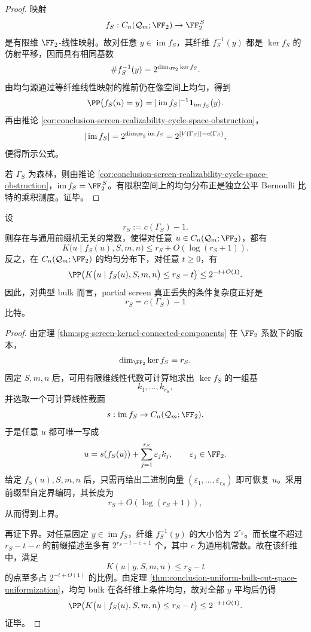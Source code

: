 \begin{proof}
映射
\[
f_S:C_n(\mathcal Q_m;\FF_2)\to \FF_2^{\,S}
\]
是有限维 \(\FF_2\)-线性映射。故对任意 \(y\in\operatorname{im}f_S\)，其纤维 \(f_S^{-1}(y)\) 都是 \(\ker f_S\) 的仿射平移，因而具有相同基数
\[
\#f_S^{-1}(y)=2^{\dim_{\FF_2}\ker f_S}.
\]
由均匀源通过等纤维线性映射的推前仍在像空间上均匀，得到
\[
\PP\bigl(f_S(u)=y\bigr)=|\operatorname{im}f_S|^{-1}\mathbf 1_{\operatorname{im}f_S}(y).
\]
再由推论 \ref{cor:conclusion-screen-realizability-cycle-space-obstruction}，
\[
|\operatorname{im}f_S|
=
2^{\dim_{\FF_2}\operatorname{im}f_S}
=
2^{|V(\Gamma_S)|-c(\Gamma_S)},
\]
便得所示公式。

若 \(\Gamma_S\) 为森林，则由推论 \ref{cor:conclusion-screen-realizability-cycle-space-obstruction}，\(\operatorname{im}f_S=\FF_2^{\,S}\)。有限积空间上的均匀分布正是独立公平 Bernoulli 比特的乘积测度。证毕。
\end{proof}

\begin{theorem}\label{thm:conclusion-screen-deficit-algorithmic-sharpness}
设
\[
r_S:=c(\Gamma_S)-1.
\]
则存在与通用前缀机无关的常数，使得对任意 \(u\in C_n(\mathcal Q_m;\FF_2)\)，都有
\[
K\bigl(u\mid f_S(u),S,m,n\bigr)
\le
r_S+O(\log(r_S+1)).
\]
反之，在 \(C_n(\mathcal Q_m;\FF_2)\) 的均匀分布下，对任意 \(t\ge 0\)，有
\[
\PP\!\left(
K\bigl(u\mid f_S(u),S,m,n\bigr)\le r_S-t
\right)
\le
2^{-t+O(1)}.
\]
因此，对典型 bulk 而言，partial screen 真正丢失的条件复杂度正好是
\[
r_S=c(\Gamma_S)-1
\]
比特。
\end{theorem}

\begin{proof}
由定理 \ref{thm:spg-screen-kernel-connected-components} 在 \(\FF_2\) 系数下的版本，
\[
\dim_{\FF_2}\ker f_S=r_S.
\]
固定 \(S,m,n\) 后，可用有限维线性代数可计算地求出 \(\ker f_S\) 的一组基
\[
k_1,\dots,k_{r_S},
\]
并选取一个可计算线性截面
\[
s:\operatorname{im}f_S\to C_n(\mathcal Q_m;\FF_2).
\]
于是任意 \(u\) 都可唯一写成
\[
u=s(f_S(u))+\sum_{j=1}^{r_S}\varepsilon_j k_j,
\qquad
\varepsilon_j\in\FF_2.
\]
给定 \(f_S(u),S,m,n\) 后，只需再给出二进制向量 \((\varepsilon_1,\dots,\varepsilon_{r_S})\) 即可恢复 \(u\)。采用前缀型自定界编码，其长度为
\[
r_S+O(\log(r_S+1)),
\]
从而得到上界。

再证下界。对任意固定 \(y\in\operatorname{im}f_S\)，纤维 \(f_S^{-1}(y)\) 的大小恰为 \(2^{r_S}\)。而长度不超过 \(r_S-t-c\) 的前缀描述至多有 \(2^{r_S-t-c+1}\) 个，其中 \(c\) 为通用机常数。故在该纤维中，满足
\[
K(u\mid y,S,m,n)\le r_S-t
\]
的点至多占 \(2^{-t+O(1)}\) 的比例。由定理 \ref{thm:conclusion-uniform-bulk-cut-space-uniformization}，均匀 bulk 在各纤维上条件均匀，故对全部 \(y\) 平均后仍得
\[
\PP\!\left(
K\bigl(u\mid f_S(u),S,m,n\bigr)\le r_S-t
\right)\le 2^{-t+O(1)}.
\]
证毕。
\end{proof}

